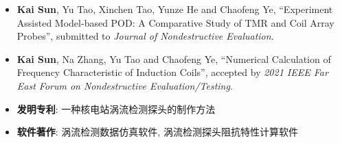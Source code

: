 \begin{itemize}
    \item \textbf{Kai Sun}, Yu Tao, Xinchen Tao, Yunze He and Chaofeng Ye,
          ``Experiment Assisted Model-based POD: A Comparative Study of TMR and Coil Array Probes'',
          submitted to \emph{Journal of Nondestructive Evaluation}.\\
          { \footnotesize {}}
    \item \textbf{Kai Sun}, Na Zhang, Yu Tao and Chaofeng Ye,
          ``Numerical Calculation of Frequency Characteristic of Induction Coils'',
          accepted by \emph{2021 IEEE Far East Forum on Nondestructive Evaluation/Testing}.\\
          { \footnotesize {}}
    \item \textbf{发明专利}: 一种核电站涡流检测探头的制作方法
    \item \textbf{软件著作}: 涡流检测数据仿真软件, 涡流检测探头阻抗特性计算软件
\end{itemize}
